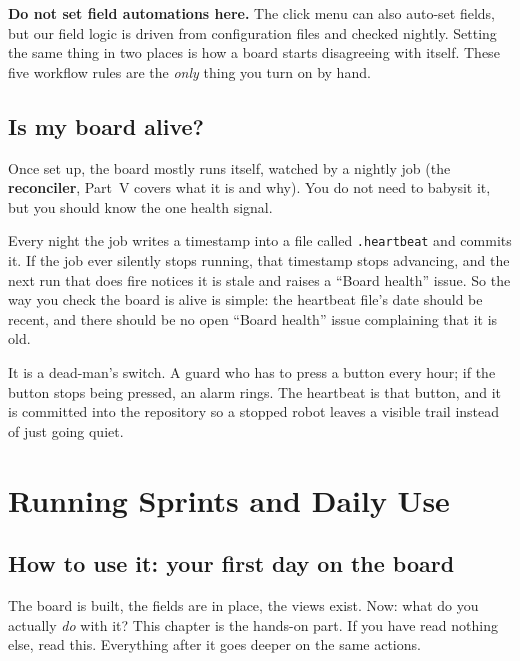 \documentclass[11pt,a4paper]{report}
\newcommand{\code}[1]{\texttt{#1}}
\begin{document}
\begin{gotcha}
\textbf{Do not set field automations here.} The click menu can also auto-set fields,
but our field logic is driven from configuration files and checked nightly. Setting
the same thing in two places is how a board starts disagreeing with itself. These
five workflow rules are the \emph{only} thing you turn on by hand.
\end{gotcha}

\chapter{Is my board alive?}

Once set up, the board mostly runs itself, watched by a nightly job (the
\textbf{reconciler}, Part~V covers what it is and why). You do not need to babysit
it, but you should know the one health signal.

Every night the job writes a timestamp into a file called \code{.heartbeat} and
commits it. If the job ever silently stops running, that timestamp stops advancing,
and the next run that does fire notices it is stale and raises a ``Board health''
issue. So the way you check the board is alive is simple: the heartbeat file's date
should be recent, and there should be no open ``Board health'' issue complaining
that it is old.

\begin{plainenglish}
It is a dead-man's switch. A guard who has to press a button every hour; if the
button stops being pressed, an alarm rings. The heartbeat is that button, and it is
committed into the repository so a stopped robot leaves a visible trail instead of
just going quiet.
\end{plainenglish}

\part{Running Sprints and Daily Use}

\chapter{How to use it: your first day on the board}

The board is built, the fields are in place, the views exist. Now: what do you
actually \emph{do} with it? This chapter is the hands-on part. If you have read
nothing else, read this. Everything after it goes deeper on the same actions.
\end{document}
